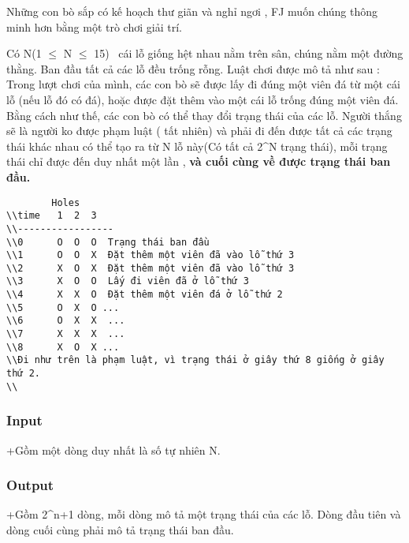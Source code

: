 



   Những con bò sắp có kế hoạch thư giãn và nghỉ ngơi , FJ muốn chúng thông minh hơn bằng một trò chơi giải trí.  

   Có N(1 $\le$ N $\le$ 15)  cái lỗ giống hệt nhau nằm trên sân, chúng nằm một đường thằng. Ban đầu tất cả các lỗ đều trống rỗng. Luật chơi được mô tả như sau : Trong lượt chơi của mình, các con bò sẽ được lấy đi đúng một viên đá từ một cái lỗ (nếu lỗ đó có đá), hoặc được đặt thêm vào một cái lỗ trống đúng một viên đá. Bằng cách như thế, các con bò có thể thay đổi trạng thái của các lỗ. Người thắng sẽ là người ko được phạm luật ( tất nhiên) và phải đi đến được tất cả các trạng thái khác nhau có thể tạo ra từ N lỗ này(Có tất cả 2^N trạng thái), mỗi trạng thái chỉ được đến duy nhất một lần ,   \textbf{    và cuối cùng về được trạng thái ban đầu.   }
\begin{verbatim}
        Holes
\\time   1  2  3 
\\-----------------
\\0      O  O  O  Trạng thái ban đầu
\\1      O  O  X  Đặt thêm một viên đã vào lỗ thứ 3
\\2      X  O  X  Đặt thêm một viên đã vào lỗ thứ 3
\\3      X  O  O  Lấy đi viên đã ở lỗ thứ 3
\\4      X  X  O  Đặt thêm một viên đá ở lỗ thứ 2
\\5      O  X  O ...
\\6      O  X  X  ...
\\7      X  X  X  ...
\\8      X  O  X ...
\\Đi như trên là phạm luật, vì trạng thái ở giây thứ 8 giống ở giây thứ 2.
\\\end{verbatim}

\subsubsection{   Input  }

   +Gồm một dòng duy nhất là số tự nhiên N.  

\subsubsection{   Output  }

   +Gồm 2^n+1 dòng, mỗi dòng mô tả một trạng thái của các lỗ. Dòng đầu tiên và dòng cuối cùng phải mô tả trạng thái ban đầu.  

